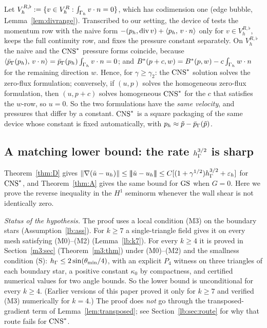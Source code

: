 \begin{remark}\label{rem:fnz}
Let $V_h^{R,\flat}:=\{v\in V_h^R:\int_{\Gamma_h}v\cdot n=0\}$, which has codimension one (edge bubble, Lemma~\ref{lem:divrange}). Transcribed to our setting, the device of \cite[Section~5.1]{FrachonNilssonZahedi2024} tests the momentum row with the naive form $-(p_h,\operatorname{div} v)+\langle p_h,\, v\cdot n\rangle$ only for $v\in V_h^{R,\flat}$, keeps the full continuity row, and fixes the pressure constant separately. On $V_h^{R,\flat}$ the naive and the $\mathrm{CNS}^\ast$ pressure forms coincide, because $\langle \bar p_{\Gamma}(p_h),\, v\cdot n\rangle=\bar p_{\Gamma}(p_h)\int_{\Gamma_h}v\cdot n=0$; and $B^\ast(p+c,w)=B^\ast(p,w)-c\int_{\Gamma_h}w\cdot n$ for the remaining direction $w$. Hence, for $\gamma\ge\gamma_2$: the $\mathrm{CNS}^\ast$ solution solves the zero-flux formulation; conversely, if $(u,p)$ solves the homogeneous zero-flux formulation, then $(u,p+c)$ solves homogeneous $\mathrm{CNS}^\ast$ for the $c$ that satisfies the $w$-row, so $u=0$. So the two formulations have the \emph{same velocity}, and pressures that differ by a constant. $\mathrm{CNS}^\ast$ is a square packaging of the same device whose constant is fixed automatically, with $p_h\approx\tilde p-\bar p_{\Gamma}(\tilde p)$.
\end{remark}

\subsection{A matching lower bound: the rate \texorpdfstring{$h_\Gamma^{3/2}$}{h^{3/2}} is sharp}\label{lb:sec}

Theorem~\ref{thm:D} gives $\lVert \nabla(\tilde u-u_h)\rVert\le|\!|\!|\tilde u-u_h|\!|\!|\le C[(1+\gamma^{1/2})h_\Gamma^{3/2}+\varepsilon_h]$ for $\mathrm{CNS}^\ast$, and Theorem~\ref{thm:A} gives the same bound for $\mathrm{GS}$ when $G=0$. Here we prove the reverse inequality in the $H^1$ seminorm whenever the wall shear is not identically zero.

\emph{Status of the hypothesis.} The proof uses a local condition (M3) on the boundary stars (Assumption~\ref{lb:ass}). For $k\ge7$ a single-triangle field gives it on every mesh satisfying (M0)--(M2) (Lemma~\ref{lb:k7}). For every $k\ge4$ it is proved in Section~\ref{m3:sec} (Theorem~\ref{m3:thm}) under (M0)--(M2) and the smallness condition (S): $h_\Gamma\le2\sin(\theta_{\min}/4)$, with an explicit $P_4$ witness on three triangles of each boundary star, a positive constant $\kappa_0$ by compactness, and certified numerical values for two angle bounds. So the lower bound is unconditional for every $k\ge4$. (Earlier versions of this paper proved it only for $k\ge7$ and verified (M3) numerically for $k=4$.) The proof does \emph{not} go through the transposed-gradient term of Lemma~\ref{lem:transposed}; see Section~\ref{lb:sec:route} for why that route fails for $\mathrm{CNS}^\ast$.

